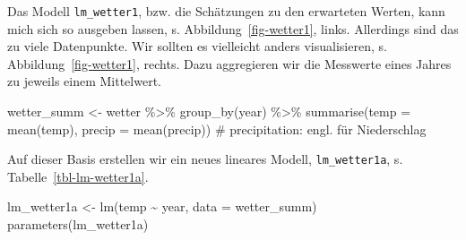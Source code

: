 \documentclass[
  letterpaper,
  oneside,
  open=any]{scrbook}
\newenvironment{Shaded}{\begin{snugshade}}{\end{snugshade}}
\newcommand{\AttributeTok}[1]{\textcolor[rgb]{0.40,0.45,0.13}{#1}}
\newcommand{\CommentTok}[1]{\textcolor[rgb]{0.37,0.37,0.37}{#1}}
\newcommand{\FunctionTok}[1]{\textcolor[rgb]{0.28,0.35,0.67}{#1}}
\newcommand{\NormalTok}[1]{\textcolor[rgb]{0.00,0.23,0.31}{#1}}
\newcommand{\OtherTok}[1]{\textcolor[rgb]{0.00,0.23,0.31}{#1}}
\newcommand{\SpecialCharTok}[1]{\textcolor[rgb]{0.37,0.37,0.37}{#1}}
\theoremstyle{definition}
\theoremstyle{definition}
\theoremstyle{definition}
\theoremstyle{remark}
\begin{document}
Das Modell \texttt{lm\_wetter1}, bzw. die Schätzungen zu den erwarteten
Werten, kann mich sich so ausgeben lassen, s.
Abbildung~\ref{fig-wetter1}, links. Allerdings sind das zu viele
Datenpunkte. Wir sollten es vielleicht anders visualisieren, s.
Abbildung~\ref{fig-wetter1}, rechts. Dazu aggregieren wir die Messwerte
eines Jahres zu jeweils einem Mittelwert.

\begin{Shaded}
\begin{Highlighting}[]
\NormalTok{wetter\_summ }\OtherTok{\textless{}{-}}
\NormalTok{  wetter }\SpecialCharTok{\%\textgreater{}\%} 
  \FunctionTok{group\_by}\NormalTok{(year) }\SpecialCharTok{\%\textgreater{}\%} 
  \FunctionTok{summarise}\NormalTok{(}\AttributeTok{temp =} \FunctionTok{mean}\NormalTok{(temp),}
            \AttributeTok{precip =} \FunctionTok{mean}\NormalTok{(precip))  }\CommentTok{\# precipitation: engl. für Niederschlag}
\end{Highlighting}
\end{Shaded}

Auf dieser Basis erstellen wir ein neues lineares Modell,
\texttt{lm\_wetter1a}, s. Tabelle~\ref{tbl-lm-wetter1a}.

\begin{Shaded}
\begin{Highlighting}[]
\NormalTok{lm\_wetter1a }\OtherTok{\textless{}{-}} \FunctionTok{lm}\NormalTok{(temp }\SpecialCharTok{\textasciitilde{}}\NormalTok{ year, }\AttributeTok{data =}\NormalTok{ wetter\_summ)}
\FunctionTok{parameters}\NormalTok{(lm\_wetter1a)}
\end{Highlighting}
\end{Shaded}
\end{document}
